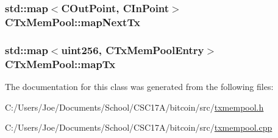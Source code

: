 \subsubsection[{map\+Next\+Tx}]{\setlength{\rightskip}{0pt plus 5cm}std\+::map$<$C\+Out\+Point, {\bf C\+In\+Point}$>$ C\+Tx\+Mem\+Pool\+::map\+Next\+Tx}\label{class_c_tx_mem_pool_aae6f1162f0b2e42b369971f32a9f71e8}
\hypertarget{class_c_tx_mem_pool_a5cd374a559b02a6485ca8cef769f9930}{}
\subsubsection[{map\+Tx}]{\setlength{\rightskip}{0pt plus 5cm}std\+::map$<${\bf uint256}, {\bf C\+Tx\+Mem\+Pool\+Entry}$>$ C\+Tx\+Mem\+Pool\+::map\+Tx}\label{class_c_tx_mem_pool_a5cd374a559b02a6485ca8cef769f9930}


The documentation for this class was generated from the following files\+:\begin{DoxyCompactItemize}
\item 
C\+:/\+Users/\+Joe/\+Documents/\+School/\+C\+S\+C17\+A/bitcoin/src/\hyperlink{txmempool_8h}{txmempool.\+h}\item 
C\+:/\+Users/\+Joe/\+Documents/\+School/\+C\+S\+C17\+A/bitcoin/src/\hyperlink{txmempool_8cpp}{txmempool.\+cpp}\end{DoxyCompactItemize}

